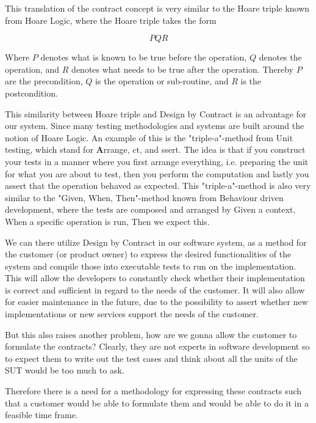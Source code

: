 This translation of the contract concept is very similar to the Hoare triple known from Hoare Logic, where the Hoare triple takes the form

\begin{equation}
{P} Q {R}
\end{equation}

Where $P$ denotes what is known to be true before the operation, $Q$ denotes the operation, and $R$ denotes what needs to be true after the operation. Thereby $P$ are the precondition, $Q$ is the operation or sub-routine, and $R$ is the postcondition. 

This similarity between Hoare triple and Design by Contract is an advantage for our system. Since many testing methodologies and systems are built around the notion of Hoare Logic. 
An example of this is the "triple-a"-method from Unit testing, which stand for \textbf{A}rrange, ct, and ssert.
The idea is that if you construct your tests in a manner where you first arrange everything, i.e. preparing the unit for what you are about to test, then you perform the computation and lastly you assert that the operation behaved as expected. 
This "triple-a"-method is also very similar to the "Given, When, Then"-method known from Behaviour driven development, where the tests are composed and arranged by Given a context, When a specific operation is run, Then we expect this. 

We can there utilize Design by Contract in our software system, as a method for the customer (or product owner) to express the desired functionalities of the system and compile those into executable tests to run on the implementation. 
This will allow the developers to constantly check whether their implementation is correct and sufficient in regard to the needs of the customer. 
It will also allow for easier maintenance in the future, due to the possibility to assert whether new implementations or new services support the needs of the customer.

But this also raises another problem, how are we gonna allow the customer to formulate the contracts? 
Clearly, they are not experts in software development so to expect them to write out the test cases and think about all the units of the SUT would be too much to ask.

Therefore there is a need for a methodology for expressing these contracts such that a customer would be able to formulate them and would be able to do it in a feasible time frame.